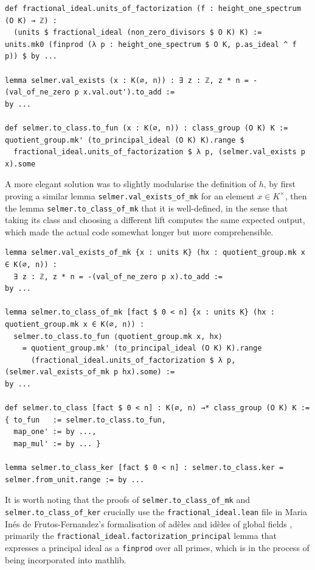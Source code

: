 \begin{lstlisting}[frame=single]
def fractional_ideal.units_of_factorization (f : height_one_spectrum (O K) → ℤ) :
  (units $ fractional_ideal (non_zero_divisors $ O K) K) :=
units.mk0 (finprod (λ p : height_one_spectrum $ O K, p.as_ideal ^ f p)) $ by ...

lemma selmer.val_exists (x : K(∅, n)) : ∃ z : ℤ, z * n = -(val_of_ne_zero p x.val.out').to_add :=
by ...

def selmer.to_class.to_fun (x : K(∅, n)) : class_group (O K) K :=
quotient_group.mk' (to_principal_ideal (O K) K).range $
  fractional_ideal.units_of_factorization $ λ p, (selmer.val_exists p x).some
\end{lstlisting}

A more elegant solution was to slightly modularise the definition of $ h $, by first proving a similar lemma \texttt{selmer.val\_exists\_of\_mk} for an element $ x \in K^\times $, then the lemma \texttt{selmer.to\_class\_of\_mk} that it is well-defined, in the sense that taking its class and choosing a different lift computes the same expected output, which made the actual code somewhat longer but more comprehensible.

\begin{lstlisting}[frame=single]
lemma selmer.val_exists_of_mk {x : units K} (hx : quotient_group.mk x ∈ K(∅, n)) :
  ∃ z : ℤ, z * n = -(val_of_ne_zero p x).to_add :=
by ...

lemma selmer.to_class_of_mk [fact $ 0 < n] {x : units K} (hx : quotient_group.mk x ∈ K(∅, n)) :
  selmer.to_class.to_fun ⟨quotient_group.mk x, hx⟩
    = quotient_group.mk' (to_principal_ideal (O K) K).range
      (fractional_ideal.units_of_factorization $ λ p, (selmer.val_exists_of_mk p hx).some) :=
by ...

def selmer.to_class [fact $ 0 < n] : K(∅, n) →* class_group (O K) K :=
{ to_fun   := selmer.to_class.to_fun,
  map_one' := by ...,
  map_mul' := by ... }

lemma selmer.to_class_ker [fact $ 0 < n] : selmer.to_class.ker = selmer.from_unit.range := by ...
\end{lstlisting}

It is worth noting that the proofs of \texttt{selmer.to\_class\_of\_mk} and \texttt{selmer.to\_class\_of\_ker} crucially use the \texttt{fractional\_ideal.lean} file in Maria In\'es de Frutos-Fernandez's formalisation of ad\`eles and id\`eles of global fields \cite{Fru22}, primarily the \texttt{fractional\_ideal.factorization\_principal} lemma that expresses a principal ideal as a \texttt{finprod} over all primes, which is in the process of being incorporated into mathlib.

